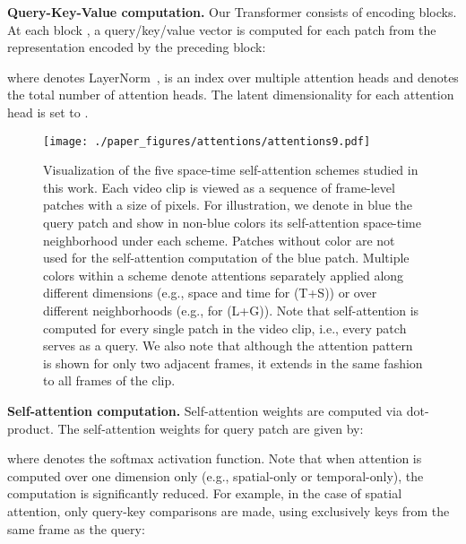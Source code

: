 \documentclass{article}
\begin{document}
\textbf{Query-Key-Value computation.} Our Transformer consists of  encoding blocks. At each block , a query/key/value vector is computed for each patch from the representation  encoded by the preceding block:

\vspace{-0.4cm}

\vspace{-0.3cm}

where  denotes LayerNorm~\cite{DBLP:journals/corr/BaKH16},  is an index over multiple attention heads and  denotes the total number of attention heads. The latent dimensionality for each attention head is set to .



\begin{figure*}[t]
\begin{center}
   \texttt{[image: ./paper\_figures/attentions/attentions9.pdf]}
\end{center}
\vspace{-0.5cm}
        \caption{Visualization of the five space-time self-attention schemes studied in this work. Each video clip is viewed as a sequence of frame-level patches with a size of  pixels. For illustration, we denote in blue the query patch and show in non-blue colors its self-attention space-time neighborhood under each scheme. Patches without color are not used for the self-attention computation of the blue patch. Multiple colors within a scheme denote attentions separately applied along different dimensions (e.g., space and time for (T+S)) or over different neighborhoods (e.g., for (L+G)). Note that self-attention is computed for every single patch in the video clip, i.e., every patch serves as a query. We also note that although the attention pattern is shown for only two adjacent frames, it extends in the same fashion to all frames of the clip.\vspace{-0.3cm}}
\label{att_fig}
\end{figure*}



\textbf{Self-attention computation.} Self-attention weights are computed via dot-product. The self-attention weights  for query patch  are given by:

\vspace{-0.2cm}

\vspace{-0.2cm}

where  denotes the softmax activation function. Note that when attention is computed over one dimension only (e.g., spatial-only or temporal-only), the computation is significantly reduced. For example, in the case of spatial attention, only  query-key comparisons are made, using exclusively keys from the same frame as the query:
\end{document}
